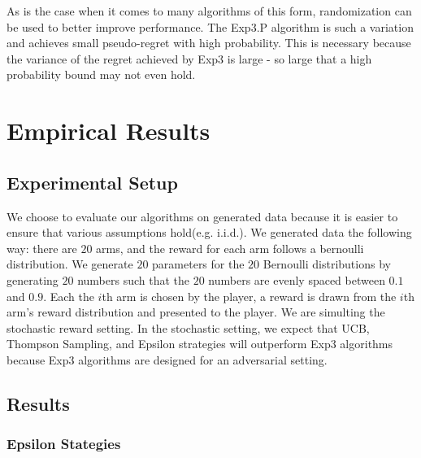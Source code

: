 \documentclass[12pt]{article}
\begin{document}
As is the case when it comes to many algorithms of this form, randomization can be used to better improve performance. The Exp3.P algorithm is such a variation and achieves small pseudo-regret with high probability. This is necessary because the variance of the regret achieved by Exp3 is large - so large that a high probability bound may not even hold. 

\section{Empirical Results}

\subsection{Experimental Setup}

We choose to evaluate our algorithms on generated data because it is easier to ensure that various assumptions hold(e.g. i.i.d.). We generated data the following way: there are $20$ arms, and the reward for each arm follows a bernoulli distribution. We generate $20$ parameters for the $20$ Bernoulli distributions by generating $20$ numbers such that the $20$ numbers are evenly spaced between $0.1$ and $0.9$. Each the $i$th arm is chosen by the player, a reward is drawn from the $i$th arm's reward distribution and presented to the player. We are simulting the stochastic reward setting. In the stochastic setting, we expect that UCB, Thompson Sampling, and Epsilon strategies will outperform Exp3 algorithms because Exp3 algorithms are designed for an adversarial setting.

\subsection{Results}

\subsubsection{Epsilon Stategies}
\end{document}
